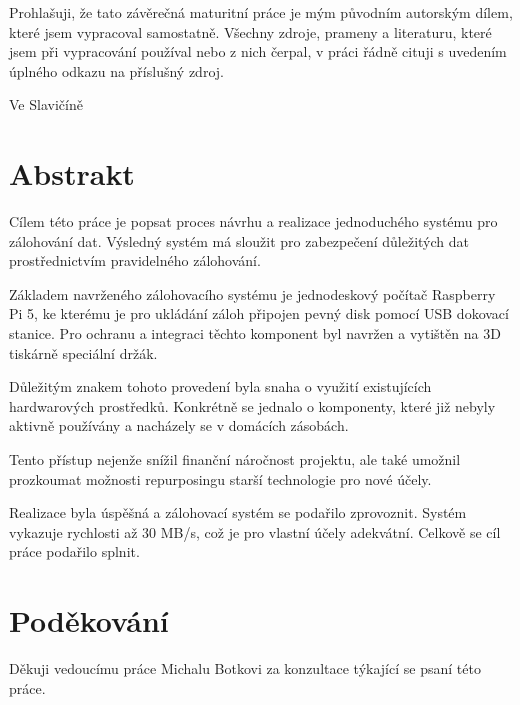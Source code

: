 \documentclass[a4paper,12pt, oneside]{book}
\makeatletter
\let\newauthor\@author
\let\newdate\@date
\makeatother
\begin{document}
\newpage


\noindent

Prohlašuji, že tato závěrečná maturitní práce je mým původním autorským dílem,
které jsem vypracoval samostatně. Všechny zdroje, prameny a literaturu, které
jsem při vypracování používal nebo z nich čerpal, v práci řádně cituji
s uvedením úplného odkazu na příslušný zdroj.

\begin{center}
Ve Slavičíně

\newdate

\vspace{10mm}

\newauthor
\end{center}

\newpage
\section*{Abstrakt}

Cílem této práce je popsat proces návrhu a realizace jednoduchého
systému pro zálohování dat. Výsledný systém má sloužit pro zabezpečení důležitých
dat prostřednictvím pravidelného zálohování.

Základem navrženého zálohovacího systému je jednodeskový počítač Raspberry Pi 5,
ke kterému je pro ukládání záloh připojen pevný disk pomocí USB
dokovací stanice. Pro ochranu a integraci těchto komponent byl navržen a
vytištěn na 3D tiskárně speciální držák. 

Důležitým znakem tohoto provedení byla snaha o využití existujících
hardwarových prostředků. Konkrétně se jednalo o komponenty, které již nebyly
aktivně používány a nacházely se v domácích zásobách.

Tento přístup nejenže snížil finanční náročnost projektu, ale také umožnil
prozkoumat možnosti repurposingu starší technologie pro nové účely.

Realizace byla úspěšná a zálohovací systém se podařilo zprovoznit. Systém
vykazuje rychlosti až 30 MB/s, což je pro vlastní účely adekvátní. Celkově 
se cíl práce podařilo splnit.

\newpage
\section*{Poděkování}

Děkuji vedoucímu práce Michalu Botkovi za konzultace týkající 
se psaní této práce. 
\end{document}
